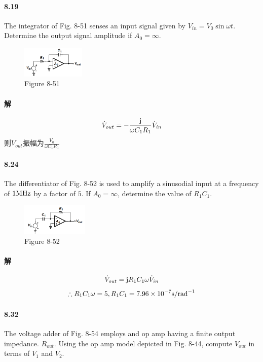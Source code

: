 \documentclass[hyperref, UTF8]{ctexart}
\newcommand{\second}{{\rm s}}
\newcommand{\radian}{{\rm rad}}
\newcommand{\megahertz}{{\rm MHz}}
\newcommand{\J}{{\rm j}}
\begin{document}
\paragraph{8.19} \label{8.19}
    The integrator of Fig. 8-51 senses an input signal given by $V_{in}=V_0\sin \omega t$. Determine the output signal amplitude if $A_0=\infty$. 

    \begin{figure}[!htb]
        \centering
        \includegraphics[width=0.269\textwidth]{p8-51.png}
        \caption*{Figure 8-51}
    \end{figure}        

\paragraph{解}
    $$\dot V_{out} = - \frac{\J}{\omega C_1 R_1} \dot V_{in}$$
    则$V_{out}$振幅为$\frac{V_0}{\omega C_1 R_1}$

\paragraph{8.24} \label{8.24}
    The differentiator of Fig. 8-52 is used to amplify a sinusodial input at a frequency of $1\megahertz$ by a factor of $5$. If $A_0 = \infty$, determine the value of $R_1C_1$.

    \begin{figure}[!htb]
        \centering
        \includegraphics[width=0.283\textwidth]{p8-52.png}
        \caption*{Figure 8-52}
    \end{figure}

\paragraph{解}
    $$\dot V_{out} = \J R_1 C_1 \omega \dot V_{in}$$
    $$\therefore R_1 C_1 \omega = 5, R_1 C_1 = 7.96 \times 10^{-7} \second/\radian^{-1}$$

\paragraph{8.32} \label{8.32}
    The voltage adder of Fig. 8-54 employs and op amp having a finite output impedance. $R_{out}$. Using the op amp model depicted in Fig. 8-44, compute $V_{out}$ in terms of $V_1$ and $V_2$.
\end{document}
